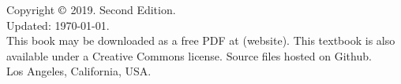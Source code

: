\documentclass[14pt]{book}
\begin{document}
	
	\null \vfill
	\noindent%
		Copyright $\copyright$ 2019. Second Edition. \\
		Updated: \today. \\
	\noindent%
		This book may be downloaded as a free PDF at (website).
		This textbook is also available under a Creative Commons license.
		Source files hosted on {Github}. \\

	\noindent Los Angeles, California, USA.
	\newpage
	\tableofcontents
	\listoffigures
	\listoftables
	
	
	
	\nocite{*}	
	
	\printbibliography   
	\printindex
\end{document}
